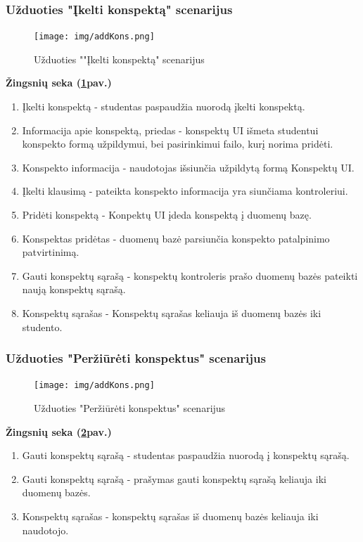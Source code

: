 \documentclass{VUMIFPSkursinis}
\begin{document}
\subsubsection{Užduoties "Įkelti konspektą" scenarijus}
\begin{figure}[H]
	\centering
	\texttt{[image: img/addKons.png]}
	\caption{Užduoties  ""Įkelti konspektą" scenarijus}
	\label{fig:addKons}
\end{figure}
\textbf{Žingsnių seka (\ref{fig:addKons}pav.)}\\
\begin{enumerate}
	\item Įkelti konspektą - studentas paspaudžia nuorodą įkelti konspektą.
	\item Informacija apie konspektą, priedas - konspektų UI išmeta studentui konspekto formą užpildymui, bei pasirinkimui failo, kurį norima pridėti.
	\item Konspekto informacija - naudotojas išsiunčia užpildytą formą Konspektų UI.
	\item Įkelti klausimą - pateikta konspekto informacija yra siunčiama kontroleriui.
	\item Pridėti konspektą - Konpektų UI įdeda konspektą į duomenų bazę.
	\item Konspektas pridėtas - duomenų bazė parsiunčia konspekto patalpinimo patvirtinimą.
	\item Gauti konspektų sąrašą - konspektų kontroleris prašo duomenų bazės pateikti naują konspektų sąrašą.
	\item Konspektų sąrašas - Konspektų sąrašas keliauja iš duomenų bazės iki studento.
\end{enumerate}
	\subsubsection{Užduoties "Peržiūrėti konspektus" scenarijus}
	\begin{figure}[H]
		\centering
		\texttt{[image: img/addKons.png]}
		\caption{Užduoties "Peržiūrėti konspektus" scenarijus}
		\label{fig:viewKons}
	\end{figure}
	\textbf{Žingsnių seka (\ref{fig:viewKons}pav.)}\\
	\begin{enumerate}
		\item Gauti konspektų sąrašą - studentas paspaudžia nuorodą į konspektų sąrašą.
		\item Gauti konspektų sąrašą - prašymas gauti konspektų sąrašą keliauja iki duomenų bazės.
		\item Konspektų sąrašas - konspektų sąrašas iš duomenų bazės keliauja iki naudotojo.
	\end{enumerate}
	\newpage
\end{document}
